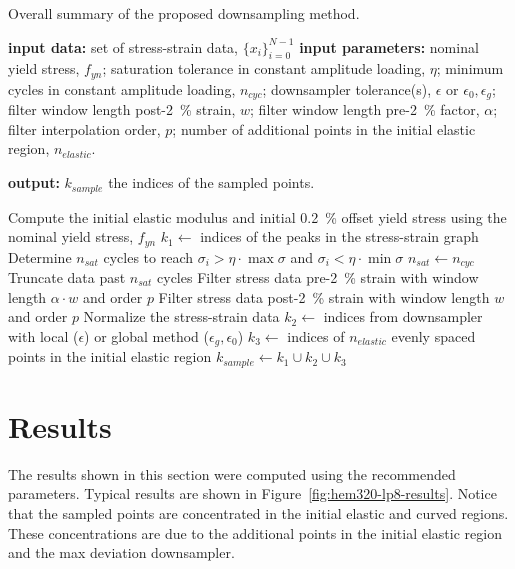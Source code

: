 \documentclass[a4paper,11pt]{article}
\begin{document}
\begin{algorithm}
	\caption{Overall summary of the proposed downsampling method.}
	\label{alg:overall-summary}
	\begin{algorithmic}[1]
        \State \textbf{input data:} set of stress-strain data, $\{x_i\}_{i=0}^{N-1}$
        \State \textbf{input parameters:} nominal yield stress, $f_{yn}$; saturation tolerance in constant amplitude loading, $\eta$; minimum cycles in constant amplitude loading, $n_{cyc}$; downsampler tolerance(s), $\epsilon$ or $\epsilon_0, \epsilon_g$; filter window length post-2~\% strain, $w$; filter window length pre-2~\% factor, $\alpha$; filter interpolation order, $p$; number of additional points in the initial elastic region, $n_{elastic}$.

        \State \textbf{output:} $k_{sample}$ the indices of the sampled points.
        \bigskip

        \State Compute the initial elastic modulus and initial 0.2~\% offset yield stress using the nominal yield stress, $f_{yn}$
        \State $k_{1} \gets $ indices of the peaks in the stress-strain graph
            \State Determine $n_{sat}$ cycles to reach $\sigma_i > \eta \cdot \max \sigma$ and $\sigma_i < \eta \cdot \min \sigma$
                \State $n_{sat} \gets n_{cyc}$
            \EndIf
            \State Truncate data past $n_{sat}$ cycles
        \EndIf
        \State Filter stress data pre-2~\% strain with window length $\alpha \cdot w$ and order $p$
        \State Filter stress data post-2~\% strain with window length $w$ and order $p$
        \State Normalize the stress-strain data
        \State $k_2 \gets$ indices from downsampler with local ($\epsilon$) or global method ($\epsilon_g, \epsilon_0$) \label{algline:downsampler}
        \State $k_3 \gets$ indices of $n_{elastic}$ evenly spaced points in the initial elastic region
        \State $k_{sample} \gets k_1 \cup k_2 \cup k_3$
    \end{algorithmic}
\end{algorithm}



\section{Results}

The results shown in this section were computed using the recommended parameters.
Typical results are shown in Figure~\ref{fig:hem320-lp8-results}.
Notice that the sampled points are concentrated in the initial elastic and curved regions.
These concentrations are due to the additional points in the initial elastic region and the max deviation downsampler.
\end{document}

